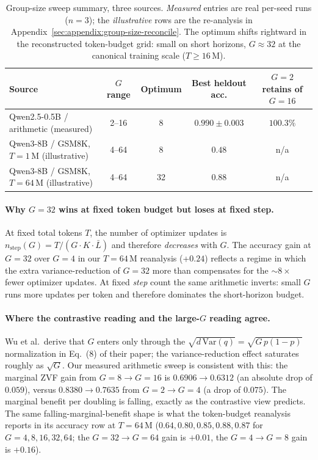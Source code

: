 \begin{table}[htbp]
\centering
\small
\begin{tabular}{lcccc}
\toprule
Source & $G$ range & Optimum & Best heldout acc. & $G{=}2$ retains of $G{=}16$ \\
\midrule
Qwen2.5-0.5B / arithmetic (measured) & 2--16 & 8 & $0.990 \pm 0.003$ & $100.3\%$ \\
Qwen3-8B / GSM8K, $T{=}1\,$M (illustrative)   & 4--64 & 8  & $0.48$ & n/a \\
Qwen3-8B / GSM8K, $T{=}64\,$M (illustrative) & 4--64 & 32 & $\mathbf{0.88}$ & n/a \\
\bottomrule
\end{tabular}
\caption{Group-size sweep summary, three sources. \emph{Measured} entries
are real per-seed runs ($n{=}3$); the \emph{illustrative} rows are the
re-analysis in Appendix~\ref{sec:appendix:group-size-reconcile}. The
optimum shifts rightward in the reconstructed token-budget grid: small on
short horizons, $G{\approx}32$ at the canonical training scale
($T{\ge}16\,$M).}
\label{tab:groupsize-summary}
\end{table}

\paragraph{Why $G{=}32$ wins at fixed token budget but loses at fixed step.}
At fixed total tokens $T$, the number of optimizer updates is
$n_\text{step}(G) = T / (G \cdot K \cdot \bar L)$ and therefore
\emph{decreases} with $G$. The accuracy gain at $G{=}32$ over $G{=}4$
in our $T{=}64\,$M reanalysis (+$0.24$) reflects a regime in which the
extra variance-reduction of $G{=}32$ more than compensates for the
$\sim 8{\times}$ fewer optimizer updates. At fixed \emph{step} count the
same arithmetic inverts: small $G$ runs more updates per token and
therefore dominates the short-horizon budget.

\paragraph{Where the contrastive reading and the large-$G$ reading agree.}
Wu et al.\ derive that $G$ enters only through the
$\sqrt{d\,\mathrm{Var}(q)} = \sqrt{G \, p(1{-}p)}$ normalization
in Eq.~(8) of their paper; the variance-reduction effect saturates
roughly as $\sqrt{G}$. Our measured arithmetic sweep is consistent with
this: the marginal ZVF gain from $G{=}8 \to G{=}16$ is
$0.6906 \to 0.6312$ (an absolute drop of $0.059$), versus
$0.8380 \to 0.7635$ from $G{=}2 \to G{=}4$ (a drop of $0.075$). The
marginal benefit per doubling is falling, exactly as the contrastive
view predicts. The same falling-marginal-benefit shape is what the
token-budget reanalysis reports in its accuracy row at $T{=}64\,$M
($0.64, 0.80, 0.85, 0.88, 0.87$ for $G{=}4, 8, 16, 32, 64$; the
$G{=}32 \to G{=}64$ gain is $+0.01$, the $G{=}4 \to G{=}8$ gain is
$+0.16$).

